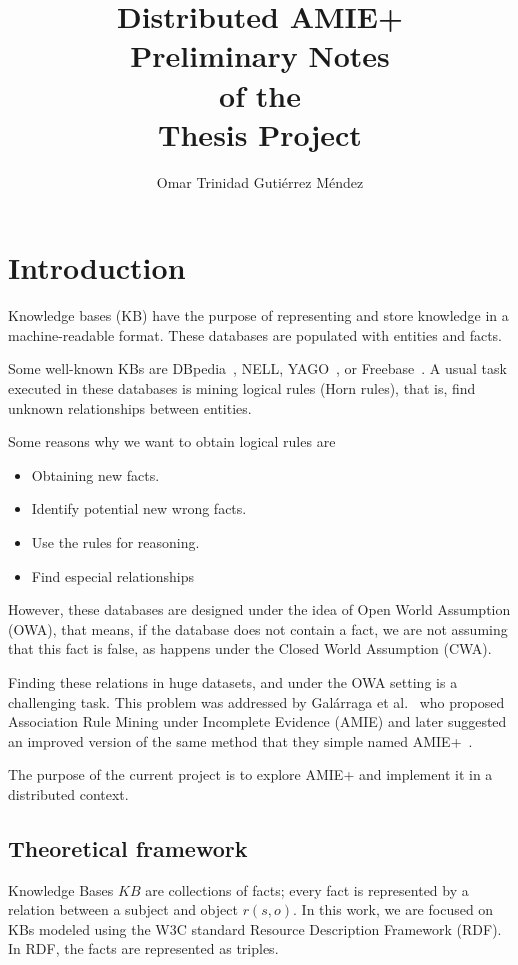 \documentclass{article}
\title{
Distributed AMIE+\\
\large
Preliminary Notes\\
of the\\
Thesis Project\\
}
\author{Omar Trinidad Guti\'errez M\'endez}
\begin{document}
\maketitle

\section{Introduction}

Knowledge bases (KB) have the purpose of representing and store knowledge in a
machine-readable format. These databases are populated with entities and facts.

Some well-known KBs are DBpedia~\cite{dbpedia-swj},
NELL, YAGO~\cite{suchanek2007yago}, or Freebase~\cite{bollacker2008freebase}. A
usual task executed in these databases is mining logical rules (Horn rules), that is, find
unknown relationships between entities.

Some reasons why we want to obtain logical rules are

\begin{itemize}
    \item Obtaining new facts.
    \item Identify potential new wrong facts.
    \item Use the rules for reasoning.
    \item Find especial relationships
\end{itemize}

However,  these databases are designed under the idea of Open World Assumption
(OWA), that means, if the database does not contain a fact, we are not assuming
that this fact is false, as happens under the Closed World Assumption (CWA).

Finding these relations in huge datasets, and under the OWA setting is a
challenging task. This problem was addressed by Galárraga et
al.~\cite{galarraga2013amie}  who proposed Association Rule Mining under
Incomplete Evidence (AMIE) and later suggested an improved version of the same
method that they simple named AMIE+~\cite{galarraga2015fast}.

The purpose of the current project is to explore AMIE+ and implement it in a
distributed context.

\subsection{Theoretical framework}

Knowledge Bases $KB$ are collections of facts; every fact is represented by a
relation between a subject and object $r(s, o)$. In this work, we are focused
on KBs modeled using the W3C standard Resource Description Framework
(RDF). In RDF, the facts are represented as triples.
\end{document}
